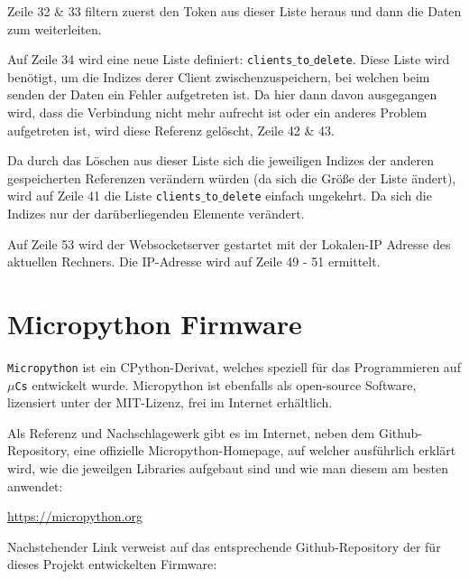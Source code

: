 \documentclass[paper=a4,12pt]{scrreprt}
\begin{document}
Zeile 32 \& 33 filtern zuerst den Token aus dieser Liste heraus und dann die Daten zum weiterleiten.\newline

Auf Zeile 34 wird eine neue Liste definiert: \texttt{clients$\_$to$\_$delete}. Diese Liste wird benötigt, um die Indizes derer Client zwischenzuspeichern, bei welchen beim senden der Daten ein Fehler aufgetreten ist.
Da hier dann davon ausgegangen wird, dass die Verbindung nicht mehr aufrecht ist oder ein anderes Problem aufgetreten ist, wird diese Referenz gelöscht, Zeile 42 \& 43.\newline

Da durch das Löschen aus dieser Liste sich die jeweiligen Indizes der anderen gespeicherten Referenzen verändern würden  (da sich die Größe der Liste ändert), wird auf Zeile 41 die Liste \texttt{clients$\_$to$\_$delete} einfach ungekehrt.
Da sich die Indizes nur der darüberliegenden Elemente verändert.\newline

Auf Zeile 53 wird der Websocketserver gestartet mit der Lokalen-IP Adresse des aktuellen Rechners. Die IP-Adresse wird auf Zeile 49 - 51 ermittelt.\newline


\chapter{Micropython Firmware}
\label{chap:firmware}

\texttt{Micropython}\cite{micropython} ist ein CPython-Derivat, welches speziell für das Programmieren auf \texttt{$\mu$Cs} entwickelt wurde. Micropython ist ebenfalls als open-source Software, lizensiert unter der MIT-Lizenz,
frei im Internet erhältlich.\newline

Als Referenz und Nachschlagewerk gibt es im Internet, neben dem Github-Repository, eine offizielle Micropython-Homepage, auf welcher ausführlich erklärt wird, wie die jeweilgen Libraries
aufgebaut sind und wie man diesem am besten anwendet:\newline

\url{https://micropython.org}\newline

Nachstehender Link verweist auf das entsprechende Github-Repository der für dieses Projekt entwickelten Firmware:\newline
\end{document}
